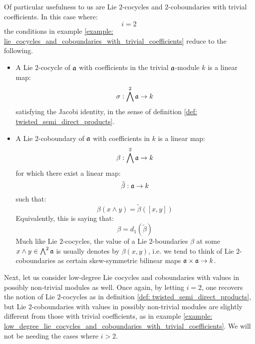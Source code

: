         \begin{example} \label{example: low_degree_lie_cocycles_and_coboundaries_with_trivial_coefficients}
            Of particular usefulness to us are Lie $2$-cocycles and $2$-coboundaries with trivial coefficients. In this case where:
                $$i = 2$$
            the conditions in example \ref{example: lie_cocycles_and_coboundaries_with_trivial_coefficients} reduce to the following.
            \begin{itemize}
                \item A Lie $2$-cocycle of $\mathfrak{a}$ with coefficients in the trivial $\mathfrak{a}$-module $k$ is a linear map:
                    $$\sigma: \bigwedge^2 \mathfrak{a} \to k$$
                satisfying the Jacobi identity, in the sense of definition \ref{def: twisted_semi_direct_products}.
                \item A Lie $2$-coboundary of $\mathfrak{a}$ with coefficients in $k$ is a linear map:
                    $$\beta: \bigwedge^2 \mathfrak{a} \to k$$
                for which there exist a linear map:
                    $$\tilde{\beta}: \mathfrak{a} \to k$$
                such that:
                    $$\beta(x \wedge y) = \tilde{\beta}([x, y])$$
                Equivalently, this is saying that:
                    $$\beta = d_1(\tilde{\beta})$$
                Much like Lie $2$-cocycles, the value of a Lie $2$-boundaries $\beta$ at some $x \wedge y \in \bigwedge^2 \mathfrak{a}$ is usually denotes by $\beta(x, y)$, i.e. we tend to think of Lie $2$-coboundaries as certain skew-symmetric bilinear maps $\a \x \a \to k$.
            \end{itemize}
        \end{example}
        
        Next, let us consider low-degree Lie cocycles and coboundaries with values in possibly non-trivial modules as well. Once again, by letting $i = 2$, one recovers the notion of Lie $2$-cocycles as in definition \ref{def: twisted_semi_direct_products}, but Lie $2$-coboundaries with values in possibly non-trivial modules are slightly different from those with trivial coefficients, as in example \ref{example: low_degree_lie_cocycles_and_coboundaries_with_trivial_coefficients}. We will not be needing the cases where $i > 2$.

